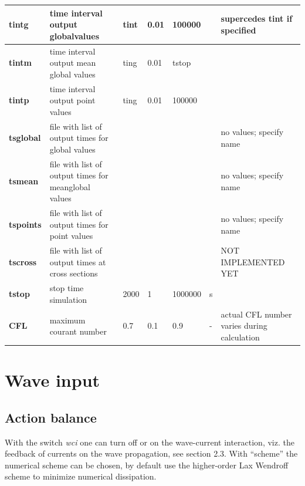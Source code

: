 \begin{tabular}{|p{0.5in}|p{0.8in}|p{0.4in}|p{0.5in}|p{0.5in}|p{0.3in}|p{0.8in}|} \hline 
\textbf{tintg} & time interval output global\newline values & tint & 0.01 & 100000 &  & supercedes tint if specified \\ \hline 
\textbf{tintm} & time interval output mean global values & ting & 0.01 & tstop &  &  \\ \hline 
\textbf{tintp} & time interval output point values & ting & 0.01 & 100000 &  &  \\ \hline 
\textbf{tsglobal} & file with list of output times for global values &  &  &  &  & no values; specify name \\ \hline 
\textbf{tsmean} & file with list of output times for meanglobal values &  &  &  &  & no values; specify name \\ \hline 
\textbf{tspoints} & file with list of output times for point values &  &  &  &  & no values; specify name \\ \hline 
\textbf{tscross} & file with list of output times at cross sections &  &  &  &  & NOT IMPLEMENTED \newline YET \\ \hline 
\textbf{tstop   } & stop time simulation & 2000 & 1 & 1000000 & s &  \\ \hline 
\textbf{CFL     } & maximum courant number & 0.7 & 0.1 & 0.9 & - & actual CFL number varies during calculation \\ \hline 
\end{tabular}


\section{Wave input}
\subsection{ Action balance}

With the switch \textit{wci} one can turn off or on the wave-current interaction, viz. the feedback of currents on the wave propagation, see section 2.3. With ``scheme'' the numerical scheme can be chosen, by default use the higher-order Lax Wendroff scheme to minimize numerical dissipation.

